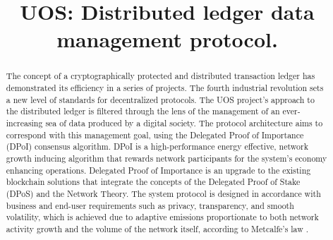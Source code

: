 \documentclass[a4paper,12pt]{article}
\title{U{\degree}OS: Distributed ledger data management protocol.}
\author{}
\begin{document}
\maketitle

\begin{abstract}

The concept of a cryptographically protected and distributed transaction ledger has demonstrated its efficiency in a series of projects. The fourth industrial revolution sets a new level of standards for decentralized protocols. The U{\degree}OS project’s approach to the distributed ledger is filtered through the lens of the management of an ever-increasing sea of data produced by a digital society. The protocol architecture aims to correspond with this management  goal, using the Delegated Proof of Importance (DPoI) consensus algorithm. DPoI is a high-performance energy effective, network growth inducing algorithm that rewards network participants for the system's economy enhancing operations. Delegated Proof of Importance is an upgrade to the existing blockchain solutions that integrate the concepts of the Delegated Proof of Stake (DPoS) and the Network Theory. The system protocol is designed in accordance with business and end-user requirements such as privacy, transparency, and smooth volatility, which is achieved due to adaptive emissions proportionate to both network activity growth and the volume of the network itself, according to Metcalfe's law \cite{Metcalfe}.

\end{abstract}
\end{document}
